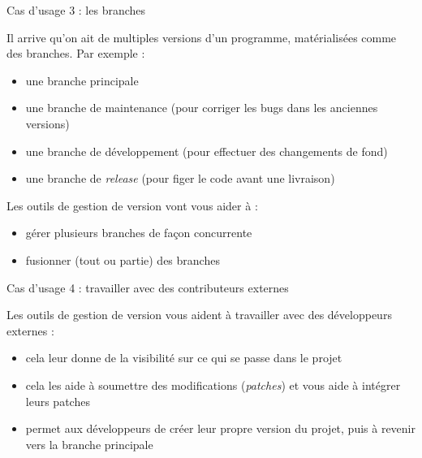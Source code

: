 \begin{frame}{%
\protect\hypertarget{cas-dusage-3-les-branches}{%
Cas d’usage 3 : les branches}}

Il arrive qu’on ait de multiples versions d’un programme, matérialisées
comme des branches. Par exemple :

\begin{itemize}
\tightlist
\item
  une branche principale
\item
  une branche de maintenance (pour corriger les bugs dans les anciennes
  versions)
\item
  une branche de développement (pour effectuer des changements de fond)
\item
  une branche de \emph{release} (pour figer le code avant une livraison)
\end{itemize}

Les outils de gestion de version vont vous aider à :

\begin{itemize}
\tightlist
\item
  gérer plusieurs branches de façon concurrente
\item
  fusionner (tout ou partie) des branches
\end{itemize}

\end{frame}

\begin{frame}{%
\protect\hypertarget{cas-dusage-4-travailler-avec-des-contributeurs-externes}{%
Cas d’usage 4 : travailler avec des contributeurs externes}}

Les outils de gestion de version vous aident à travailler avec des
développeurs externes :

\begin{itemize}
\tightlist
\item
  cela leur donne de la visibilité sur ce qui se passe dans le projet
\item
  cela les aide à soumettre des modifications (\emph{patches}) et vous
  aide à intégrer leurs patches
\item
  permet aux développeurs de créer leur propre version du projet, puis à
  revenir vers la branche principale
\end{itemize}

\end{frame}

